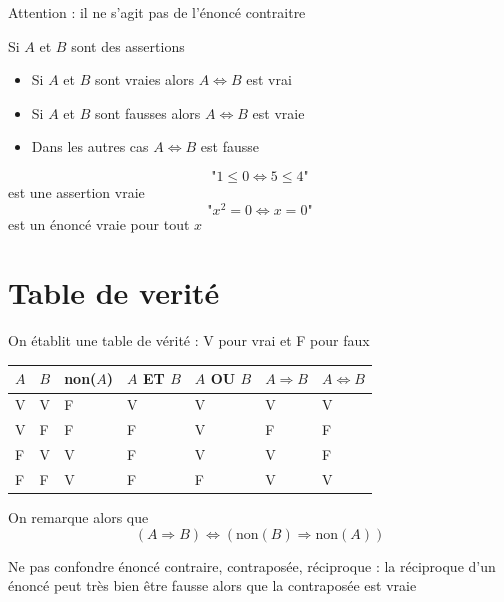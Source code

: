 Attention : il ne s'agit pas de l'énoncé contraitre\newline

\newline

Si $A$ et $B$ sont des assertions \begin{itemize} \item Si $A$ et $B$ sont vraies alors $A \Leftrightarrow B$ est vrai \item Si $A$ et $B$ sont fausses alors $A \Leftrightarrow B$ est vraie \item Dans les autres cas $A \Leftrightarrow B$ est fausse \end{itemize}
\begin{exemples}
$$\text{"}1 \leq 0 \Leftrightarrow 5 \leq 4\text{"}$$ est une assertion vraie
$$\text{"}x^2 = 0 \Leftrightarrow x = 0\text{"}$$ est un énoncé vraie pour tout $x$
\end{exemples}
\section{Table de verité}
On établit une table de vérité : V pour vrai et F pour faux\newline

\begin{tabularx}{\linewidth}{|X|X|X|X|X|X|X|}
\hline
$A$ & $B$ & non($A$) & $A$ ET $B$ & $A$ OU $B$ & $A \Rightarrow B$ & $A \Leftrightarrow B$\\ \hline
V & V & F & V & V & V & V\\ \hline
V & F & F & F & V & F & F \\ \hline
F & V & V & F & V & V & F \\ \hline
F & F & V & F & F & V & V \\ \hline
\end{tabularx}
On remarque alors que 
$$(A \Rightarrow B) \Leftrightarrow (\text{non}(B) \Rightarrow \text{non}(A))$$
\newline

Ne pas confondre énoncé contraire, contraposée, réciproque : la réciproque d'un énoncé peut très bien être fausse alors que la contraposée est vraie\newline

